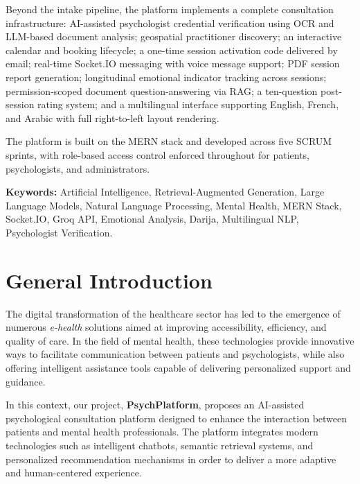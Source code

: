 \documentclass[a4paper,12pt]{report}
\begin{document}
Beyond the intake pipeline, the platform implements a complete consultation
infrastructure: AI-assisted psychologist credential verification using OCR and
LLM-based document analysis; geospatial practitioner discovery; an interactive
calendar and booking lifecycle; a one-time session activation code delivered by
email; real-time Socket.IO messaging with voice message support; PDF session
report generation; longitudinal emotional indicator tracking across sessions;
permission-scoped document question-answering via RAG; a ten-question
post-session rating system; and a multilingual interface supporting English,
French, and Arabic with full right-to-left layout rendering.

The platform is built on the MERN stack and developed across five SCRUM sprints,
with role-based access control enforced throughout for patients, psychologists,
and administrators.

\textbf{Keywords:} Artificial Intelligence, Retrieval-Augmented Generation,
Large Language Models, Natural Language Processing, Mental Health, MERN Stack,
Socket.IO, Groq API, Emotional Analysis, Darija, Multilingual NLP,
Psychologist Verification.


\tableofcontents
\clearpage

\hypersetup{pageanchor=true}


\chapter*{General Introduction}
{}

\vspace{0.5cm}

The digital transformation of the healthcare sector has led to the emergence
of numerous \textit{e-health} solutions aimed at improving accessibility,
efficiency, and quality of care. In the field of mental health, these
technologies provide innovative ways to facilitate communication between
patients and psychologists, while also offering intelligent assistance tools
capable of delivering personalized support and guidance.

In this context, our project, \textbf{PsychPlatform}, proposes an
AI-assisted psychological consultation platform designed to enhance the
interaction between patients and mental health professionals. The platform
integrates modern technologies such as intelligent chatbots, semantic
retrieval systems, and personalized recommendation mechanisms in order to
deliver a more adaptive and human-centered experience.
\end{document}
